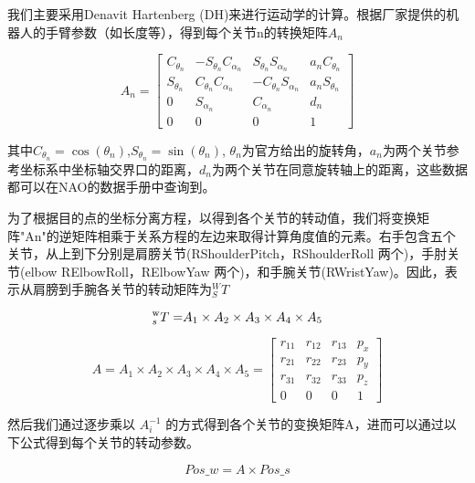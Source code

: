 我们主要采用Denavit Hartenberg (DH)来进行运动学的计算。根据厂家提供的机器人的手臂参数（如长度等），得到每个关节n的转换矩阵$A_n$

\begin{equation}
{{A}_n} = \left[ {\begin{array}{*{20}{c}}
	{{C_{{\theta _n}}}}&{ - {S_{{\theta _n}}}{C_{{\alpha _n}}}}&{{S_{{\theta _n}}}{S_{{\alpha _n}}}}&{{a_n}{C_{{\theta _n}}}}\\
	{{S_{{\theta _n}}}}&{{C_{{\theta _n}}}{C_{{\alpha _n}}}}&{ - {C_{{\theta _n}}}{S_{{\alpha _n}}}}&{{a_n}{S_{{\theta _n}}}}\\
	0&{{S_{{\alpha _n}}}}&{{C_{{\alpha _n}}}}&{{d_n}}\\
	0&0&0&1
	\end{array}} \right]
\end{equation}

其中${C_{{\theta _n}}} = \cos ({\theta _n})$,${S_{{\theta _n}}} = \sin ({\theta _n})$, ${{\theta }_{n}}$为官方给出的旋转角，$a_n$为两个关节参考坐标系中坐标轴交界口的距离，$d_n$为两个关节在同意旋转轴上的距离，这些数据都可以在NAO的数据手册中查询到。

为了根据目的点的坐标分离方程，以得到各个关节的转动值，我们将变换矩阵"An"的逆矩阵相乘于关系方程的左边来取得计算角度值的元素。右手包含五个关节，从上到下分别是肩膀关节(RShoulderPitch，RShoulderRoll 两个)，手肘关节(elbow RElbowRoll，RElbowYaw 两个)，和手腕关节(RWristYaw)。因此，表示从肩膀到手腕各关节的转动矩阵为${}_{S}^{W}{T}$

\begin{equation}
{}_{s}^{\rm{w}}{T = }{{A}_{1}} \times {{A}_{2}} \times {{A}_{3}} \times {{A}_{4}} \times {{A}_{5}}
\end{equation}

\begin{equation}
	A = {A_1} \times {A_2} \times {A_3} \times {A_4} \times {A_5} = \left[ {\begin{array}{*{20}{c}}
		{{r_{11}}}&{{r_{12}}}&{{r_{13}}}&{{p_x}}\\
		{{r_{21}}}&{{r_{22}}}&{{r_{23}}}&{{p_y}}\\
		{{r_{31}}}&{{r_{32}}}&{{r_{33}}}&{{p_z}}\\
		0&0&0&1
		\end{array}} \right]
\end{equation}

然后我们通过逐步乘以 $ A_i^{-1} $ 的方式得到各个关节的变换矩阵A，进而可以通过以下公式得到每个关节的转动参数。

\begin{equation}
{Pos\_w = A} \times {Pos\_s}
\end{equation}

